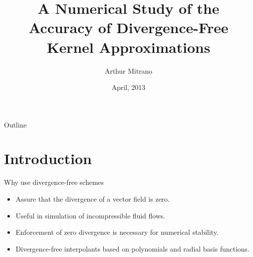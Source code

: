 \documentclass{beamer}
\title[i]{A Numerical Study of the Accuracy of Divergence-Free Kernel 
Approximations}
\subtitle{}
\author[Arthur Mitrano]
{Arthur Mitrano}
\institute[Arizona State University] %
{
  School of Mathematical and Statistical Sciences\\
  Arizona State University}
\date[AN13] %
{April, 2013}
\begin{document}
\begin{frame}
  \titlepage
\end{frame}

\begin{frame}{Outline}
  \tableofcontents
\end{frame}





\section{Introduction}
\begin{frame}{Why use divergence-free schemes}
  \begin{itemize}
    \item Assure that the divergence of a vector field is zero.

    \item Useful in simulation of incompressible fluid flows.

    \item Enforcement of zero divergence is necessary for numerical stability.

    \item Divergence-free interpolants based on polynomials and radial basis
      functions.
  \end{itemize}	
\end{frame}
\end{document}
